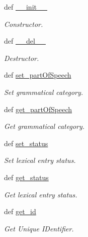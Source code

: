 \begin{DoxyCompactItemize}
\item 
def \hyperlink{classlmf_1_1src_1_1core_1_1lexical__entry_1_1_lexical_entry_a99f46e253fd0abb1999d14f4eac102d5}{\+\_\+\+\_\+init\+\_\+\+\_\+}
\begin{DoxyCompactList}\small\item\em Constructor. \end{DoxyCompactList}\item 
def \hyperlink{classlmf_1_1src_1_1core_1_1lexical__entry_1_1_lexical_entry_a7aef35b0a044411935c2fe5d6877699f}{\+\_\+\+\_\+del\+\_\+\+\_\+}
\begin{DoxyCompactList}\small\item\em Destructor. \end{DoxyCompactList}\item 
def \hyperlink{classlmf_1_1src_1_1core_1_1lexical__entry_1_1_lexical_entry_ad9aec09ea7a1664650e8667b5d161c84}{set\+\_\+part\+Of\+Speech}
\begin{DoxyCompactList}\small\item\em Set grammatical category. \end{DoxyCompactList}\item 
def \hyperlink{classlmf_1_1src_1_1core_1_1lexical__entry_1_1_lexical_entry_a198ccaea559997368ea7b0f9a198707f}{get\+\_\+part\+Of\+Speech}
\begin{DoxyCompactList}\small\item\em Get grammatical category. \end{DoxyCompactList}\item 
def \hyperlink{classlmf_1_1src_1_1core_1_1lexical__entry_1_1_lexical_entry_ab991806fefc45e2cc5f3bf88ee3d6604}{set\+\_\+status}
\begin{DoxyCompactList}\small\item\em Set lexical entry status. \end{DoxyCompactList}\item 
def \hyperlink{classlmf_1_1src_1_1core_1_1lexical__entry_1_1_lexical_entry_a616dd1fa3fbfc0db546832fd9ba5b3e2}{get\+\_\+status}
\begin{DoxyCompactList}\small\item\em Get lexical entry status. \end{DoxyCompactList}\item 
def \hyperlink{classlmf_1_1src_1_1core_1_1lexical__entry_1_1_lexical_entry_a337ed7fdab2cabc9dce913920424dd95}{get\+\_\+id}
\begin{DoxyCompactList}\small\item\em Get Unique I\+Dentifier. \end{DoxyCompactList}\item 

\end{DoxyCompactItemize}
